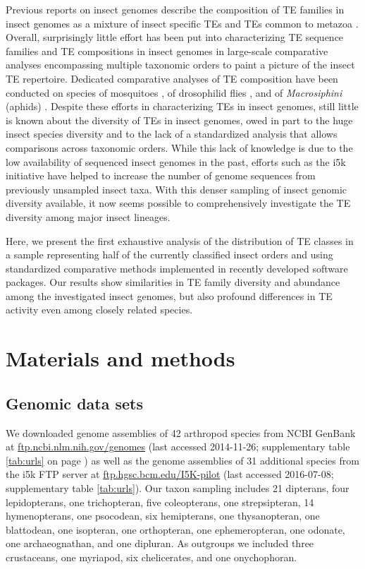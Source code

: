 Previous reports on insect genomes describe the composition of TE
families in insect genomes as a mixture of insect specific TEs and TEs
common to metazoa \citep{Feschotte2007,Maumus2015,Chuong2016}. Overall, surprisingly little
effort has been put into characterizing TE sequence families and TE
compositions in insect genomes in large-scale comparative analyses
encompassing multiple taxonomic orders to paint a picture of the insect
TE repertoire. Dedicated comparative analyses of TE composition have
been conducted on species of mosquitoes \citep{Neafsey2015}, of
drosophilid flies \citep{Sessegolo2016}, and of \emph{Macrosiphini}
(aphids) \citep{Bouallegue2017}. Despite these efforts in characterizing TEs
in insect genomes, still little is known about the diversity of TEs in
insect genomes, owed in part to the huge insect species diversity and to
the lack of a standardized analysis that allows comparisons across
taxonomic orders. While this lack of knowledge is due to the low
availability of sequenced insect genomes in the past, efforts such as
the i5k initiative \citep{Robinson2011} have helped to increase the number
of genome sequences from previously unsampled insect taxa. With this
denser sampling of insect genomic diversity available, it now seems
possible to comprehensively investigate the TE diversity among major
insect lineages.

Here, we present the first exhaustive analysis of the distribution of TE classes in a sample representing half of the currently classified insect orders and using standardized comparative methods implemented in recently developed software packages.
Our results show similarities in TE family diversity and abundance among the investigated insect genomes, but also profound differences in TE activity even among closely related species.

\section{Materials and methods}\label{materials-and-methods}

\subsection{Genomic data sets}\label{genomic-data-sets}

We downloaded genome assemblies of 42 arthropod species from NCBI
GenBank at \url{ftp.ncbi.nlm.nih.gov/genomes} (last accessed 2014-11-26;
supplementary table \ref{tab:urls} on page \pageref{tab:urls}) as well
as the genome assemblies of 31 additional species from the i5k FTP
server at \url{ftp.hgsc.bcm.edu/I5K-pilot} (last accessed 2016-07-08;
supplementary table \ref{tab:urls}). Our taxon sampling includes 21
dipterans, four lepidopterans, one trichopteran, five coleopterans, one
strepsipteran, 14 hymenopterans, one psocodean, six hemipterans, one
thysanopteran, one blattodean, one isopteran, one orthopteran, one
ephemeropteran, one odonate, one archaeognathan, and one dipluran. As
outgroups we included three crustaceans, one myriapod, six chelicerates,
and one onychophoran.

